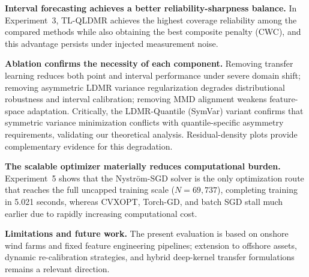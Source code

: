 \textbf{Interval forecasting achieves a better reliability-sharpness balance.} In Experiment~3, TL-QLDMR achieves the highest coverage reliability among the compared methods while also obtaining the best composite penalty (CWC), and this advantage persists under injected measurement noise.

\textbf{Ablation confirms the necessity of each component.} Removing transfer learning reduces both point and interval performance under severe domain shift; removing asymmetric LDMR variance regularization degrades distributional robustness and interval calibration; removing MMD alignment weakens feature-space adaptation. Critically, the LDMR-Quantile (SymVar) variant confirms that symmetric variance minimization conflicts with quantile-specific asymmetry requirements, validating our theoretical analysis. Residual-density plots provide complementary evidence for this degradation.

\textbf{The scalable optimizer materially reduces computational burden.} Experiment~5 shows that the Nystr\"{o}m-SGD solver is the only optimization route that reaches the full uncapped training scale ($N=69{,}737$), completing training in 5.021 seconds, whereas CVXOPT, Torch-GD, and batch SGD stall much earlier due to rapidly increasing computational cost.

\textbf{Limitations and future work.} The present evaluation is based on onshore wind farms and fixed feature engineering pipelines; extension to offshore assets, dynamic re-calibration strategies, and hybrid deep-kernel transfer formulations remains a relevant direction.
